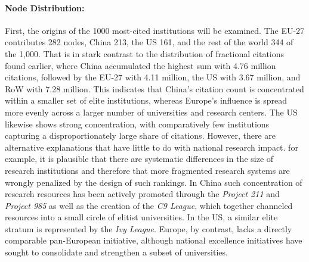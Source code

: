 \documentclass{article}
\begin{document}
	\paragraph{Node Distribution:} First, the origins of the 1000 most-cited institutions will be examined. The EU-27 contributes 282 nodes, China 213, the US 161, and the rest of the world 344 of the 1,000. That is in stark contrast to the distribution of fractional citations found earlier, where China accumulated the highest sum with 4.76 million citations, followed by the EU-27 with 4.11 million, the US with 3.67 million, and RoW with 7.28 million. This indicates that China's citation count is concentrated within a smaller set of elite institutions, whereas Europe’s influence is spread more evenly across a larger number of universities and research centers. The US likewise shows strong concentration, with comparatively few institutions capturing a disproportionately large share of citations. However, there are alternative explanations that have little to do with national research impact. for example, it is plausible that there are systematic differences in the size of research institutions and therefore that more fragmented research systems are wrongly penalized by the design of such rankings. In China such concentration of research resources has been actively promoted through the \textit{Project 211} and \textit{Project 985} as well as the creation of the \textit{C9 League}, which together channeled resources into a small circle of elitist universities. In the US, a similar elite stratum is represented by the \textit{Ivy League}. Europe, by contrast, lacks a directly comparable pan-European initiative, although national excellence initiatives have sought to consolidate and strengthen a subset of universities.
	
\end{document}
